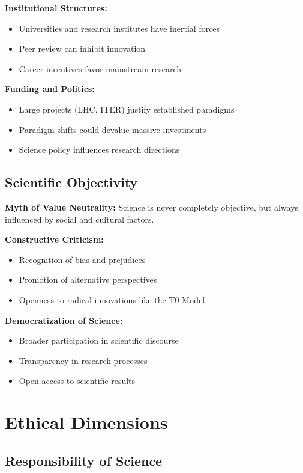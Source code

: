 \documentclass[12pt,a4paper]{report}
\begin{document}
	\textbf{Institutional Structures:}
	\begin{itemize}
		\item Universities and research institutes have inertial forces
		\item Peer review can inhibit innovation
		\item Career incentives favor mainstream research
	\end{itemize}
	
	\textbf{Funding and Politics:}
	\begin{itemize}
		\item Large projects (LHC, ITER) justify established paradigms
		\item Paradigm shifts could devalue massive investments
		\item Science policy influences research directions
	\end{itemize}
	
	\subsection{Scientific Objectivity}\label{subsec:scientific_objectivity}
	
	\textbf{Myth of Value Neutrality:}
	Science is never completely objective, but always influenced by social and cultural factors.
	
	\textbf{Constructive Criticism:}
	\begin{itemize}
		\item Recognition of bias and prejudices
		\item Promotion of alternative perspectives
		\item Openness to radical innovations like the T0-Model
	\end{itemize}
	
	\textbf{Democratization of Science:}
	\begin{itemize}
		\item Broader participation in scientific discourse
		\item Transparency in research processes
		\item Open access to scientific results
	\end{itemize}
	
	\section{Ethical Dimensions}\label{sec:ethical_dimensions}
	
	\subsection{Responsibility of Science}\label{subsec:responsibility_science}
	
\end{document}
